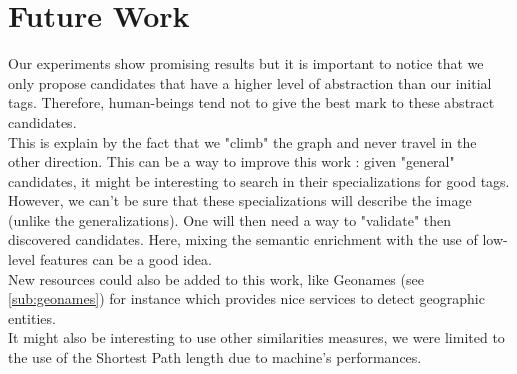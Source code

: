 
\chapter{Future Work} %

\label{chapter:FutureWork} %


Our experiments show promising results but it is important to notice that we only propose candidates that have a higher level of abstraction than our initial tags. Therefore, human-beings tend not to give the best mark to these abstract candidates.\\

This is explain by the fact that we "climb" the graph and never travel in the other direction. This can be a way to improve this work : given "general" candidates, it might be interesting to search in their specializations for good tags. However, we can't be sure that these specializations will describe the image (unlike the generalizations). One will then need a way to "validate" then discovered candidates. Here, mixing the semantic enrichment with the use of low-level features can be a good idea.\\

New resources could also be added to this work, like Geonames (see \ref{sub:geonames}) for instance which provides nice services to detect geographic entities.\\

It might also be interesting to use other similarities measures, we were limited to the use of the Shortest Path length due to machine's performances.